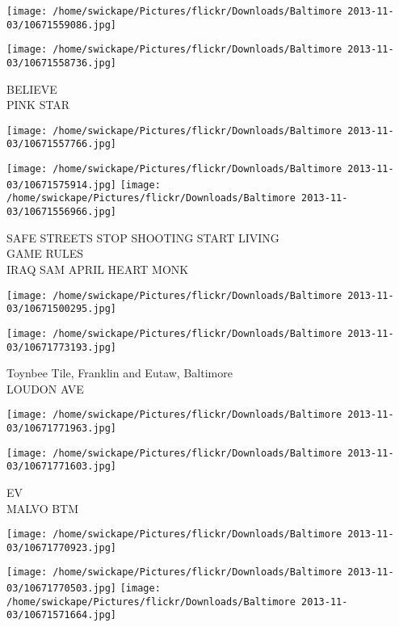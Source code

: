 \documentclass[10pt,letterpaper]{article}
\begin{document}
\texttt{[image: /home/swickape/Pictures/flickr/Downloads/Baltimore 2013-11-03/10671559086.jpg]}

\vspace{0.25in}
\texttt{[image: /home/swickape/Pictures/flickr/Downloads/Baltimore 2013-11-03/10671558736.jpg]}

BELIEVE\\
PINK STAR
\pagebreak

\texttt{[image: /home/swickape/Pictures/flickr/Downloads/Baltimore 2013-11-03/10671557766.jpg]}

\vspace{0.25in}
\texttt{[image: /home/swickape/Pictures/flickr/Downloads/Baltimore 2013-11-03/10671575914.jpg]}
\texttt{[image: /home/swickape/Pictures/flickr/Downloads/Baltimore 2013-11-03/10671556966.jpg]}

SAFE STREETS STOP SHOOTING START LIVING\\
GAME RULES\\
IRAQ SAM APRIL HEART MONK
\pagebreak

\texttt{[image: /home/swickape/Pictures/flickr/Downloads/Baltimore 2013-11-03/10671500295.jpg]}

\vspace{0.25in}
\texttt{[image: /home/swickape/Pictures/flickr/Downloads/Baltimore 2013-11-03/10671773193.jpg]}

Toynbee Tile, Franklin and Eutaw, Baltimore\\
LOUDON AVE
\pagebreak

\texttt{[image: /home/swickape/Pictures/flickr/Downloads/Baltimore 2013-11-03/10671771963.jpg]}

\vspace{0.25in}
\texttt{[image: /home/swickape/Pictures/flickr/Downloads/Baltimore 2013-11-03/10671771603.jpg]}

EV\\
MALVO BTM
\pagebreak

\texttt{[image: /home/swickape/Pictures/flickr/Downloads/Baltimore 2013-11-03/10671770923.jpg]}

\vspace{0.25in}
\texttt{[image: /home/swickape/Pictures/flickr/Downloads/Baltimore 2013-11-03/10671770503.jpg]}
\texttt{[image: /home/swickape/Pictures/flickr/Downloads/Baltimore 2013-11-03/10671571664.jpg]}
\end{document}
